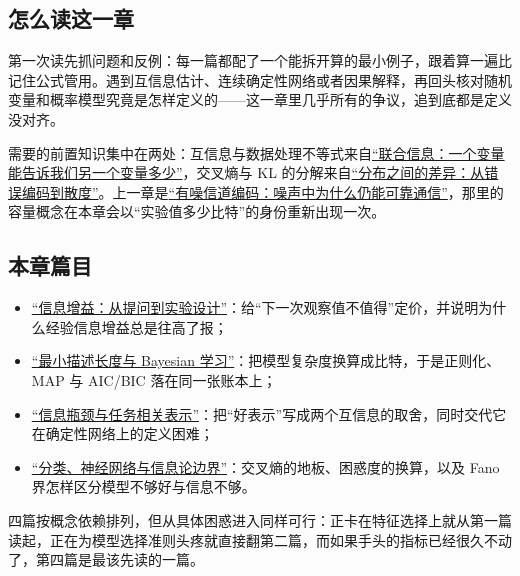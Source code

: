 \subsection{怎么读这一章}

第一次读先抓问题和反例：每一篇都配了一个能拆开算的最小例子，跟着算一遍比记住公式管用。遇到互信息估计、连续确定性网络或者因果解释，再回头核对随机变量和概率模型究竟是怎样定义的——这一章里几乎所有的争议，追到底都是定义没对齐。

需要的前置知识集中在两处：互信息与数据处理不等式来自\hyperref[ch:055]{``联合信息：一个变量能告诉我们另一个变量多少''}，交叉熵与 KL 的分解来自\hyperref[ch:056]{``分布之间的差异：从错误编码到散度''}。上一章是\hyperref[ch:058]{``有噪信道编码：噪声中为什么仍能可靠通信''}，那里的容量概念在本章会以``实验值多少比特''的身份重新出现一次。

\subsection{本章篇目}

\begin{itemize}
\tightlist
\item \hyperref[sec:07-Information-Theory/06-Information-and-Learning/01]{``信息增益：从提问到实验设计''}：给``下一次观察值不值得''定价，并说明为什么经验信息增益总是往高了报；
\item \hyperref[sec:07-Information-Theory/06-Information-and-Learning/02]{``最小描述长度与 Bayesian 学习''}：把模型复杂度换算成比特，于是正则化、MAP 与 AIC/BIC 落在同一张账本上；
\item \hyperref[sec:07-Information-Theory/06-Information-and-Learning/03]{``信息瓶颈与任务相关表示''}：把``好表示''写成两个互信息的取舍，同时交代它在确定性网络上的定义困难；
\item \hyperref[sec:07-Information-Theory/06-Information-and-Learning/04]{``分类、神经网络与信息论边界''}：交叉熵的地板、困惑度的换算，以及 Fano 界怎样区分模型不够好与信息不够。
\end{itemize}

四篇按概念依赖排列，但从具体困惑进入同样可行：正卡在特征选择上就从第一篇读起，正在为模型选择准则头疼就直接翻第二篇，而如果手头的指标已经很久不动了，第四篇是最该先读的一篇。
